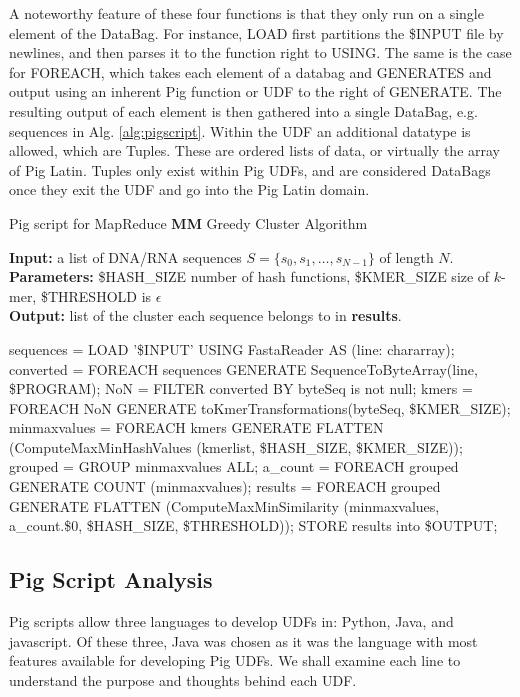 \documentclass[../../main.tex]{subfiles}
\begin{document}
A noteworthy feature of these four functions is that they only run on a single element of the DataBag. For instance, LOAD first partitions the \$INPUT file by newlines, and then parses it to the function right to USING. The same is the case for FOREACH, which takes each element of a databag and GENERATES and output using an inherent Pig function or UDF to the right of GENERATE. The resulting output of each element is then gathered into a single DataBag, e.g. sequences in Alg. \ref{alg:pigscript}. Within the UDF an additional datatype is allowed, which are Tuples. These are ordered lists of data, or virtually the array of Pig Latin. Tuples only exist within Pig UDFs, and are considered DataBags once they exit the UDF and go into the Pig Latin domain.  
\begin{algorithm}
\caption{Pig script for MapReduce {\bf MM} Greedy Cluster Algorithm}\label{alg:pigscript}
\textbf{Input:} a list of DNA/RNA sequences $S=\{s_0,s_1,\ldots,s_{N-1}\}$ of length $N$.\\
\textbf{Parameters:} \$HASH\_SIZE number of hash functions, \$KMER\_SIZE size of $k$-mer,	\$THRESHOLD is $\epsilon$\\
\textbf{Output:} list of the cluster each sequence belongs to in \textbf{results}.
\begin{algorithmic}[1]
\State sequences = LOAD '\$INPUT' USING FastaReader AS (line: chararray);
\State converted = FOREACH sequences GENERATE SequenceToByteArray(line, \$PROGRAM);
\State NoN = FILTER converted BY byteSeq is not null;
\State kmers = FOREACH NoN GENERATE toKmerTransformations(byteSeq, \$KMER\_SIZE);
\State minmaxvalues = FOREACH kmers GENERATE FLATTEN (ComputeMaxMinHashValues (kmerlist, \$HASH\_SIZE, \$KMER\_SIZE));
\State grouped = GROUP minmaxvalues ALL;
\State a\_count = FOREACH grouped GENERATE COUNT (minmaxvalues);
\State results = FOREACH grouped GENERATE FLATTEN (ComputeMaxMinSimilarity (minmaxvalues, a\_count.\$0, \$HASH\_SIZE, \$THRESHOLD));
\State STORE results into \$OUTPUT;
\end{algorithmic}
\end{algorithm}
\subsection{Pig Script Analysis}

Pig scripts allow three languages to develop UDFs in: Python, Java, and javascript. Of these three, Java was chosen as it was the language with most features available for developing Pig UDFs. We shall examine each line to understand the purpose and thoughts behind each UDF.\\
\end{document}
